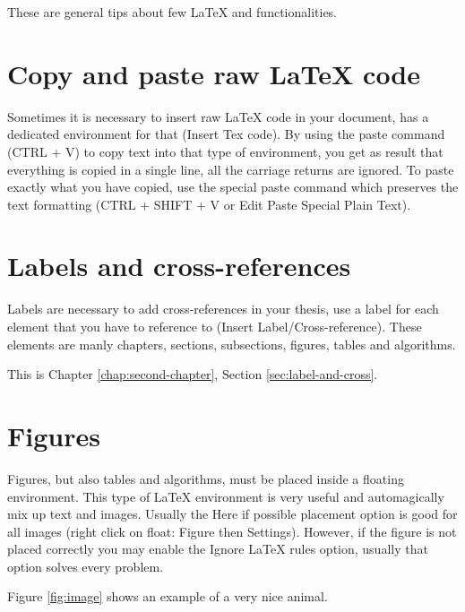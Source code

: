 These are general tips about few \LaTeX{} and \LyX{} functionalities.

\section{Copy and paste raw \protect\LaTeX{} code}

Sometimes it is necessary to insert raw \LaTeX{} code in your document,
\LyX{} has a dedicated environment for that (\textsf{Insert} \textsf{\lyxarrow}
\textsf{Tex code}). By using the paste command (\textsf{CTRL + V})
to copy text into that type of environment, you get as result that
everything is copied in a single line, all the carriage returns are
ignored. To paste exactly what you have copied, use the special paste
command which preserves the text formatting (\textsf{CTRL + SHIFT
+ V} or \textsf{Edit} \textsf{\lyxarrow{} Paste Special \lyxarrow Plain
Text}).

\section{Labels and cross-references\label{sec:label-and-cross}}

Labels are necessary to add cross-references in your thesis, use a
label for each element that you have to reference to (\textsf{Insert}
\textsf{\lyxarrow} \textsf{Label/Cross-reference}). These elements
are manly chapters, sections, subsections, figures, tables and algorithms.

This is Chapter \ref{chap:second-chapter}, Section \ref{sec:label-and-cross}.

\section{Figures}

Figures, but also tables and algorithms, must be placed inside a floating
environment. This type of \LaTeX{} environment is very useful and automagically
mix up text and images. Usually the \textsf{Here if possible} placement
option is good for all images (right click on \textsf{float: Figure}
then \textsf{Settings}). However, if the figure is not placed correctly
you may enable the \textsf{Ignore \LaTeX{} rules} option, usually that
option solves every problem.

Figure \ref{fig:image} shows an example of a very nice animal.

